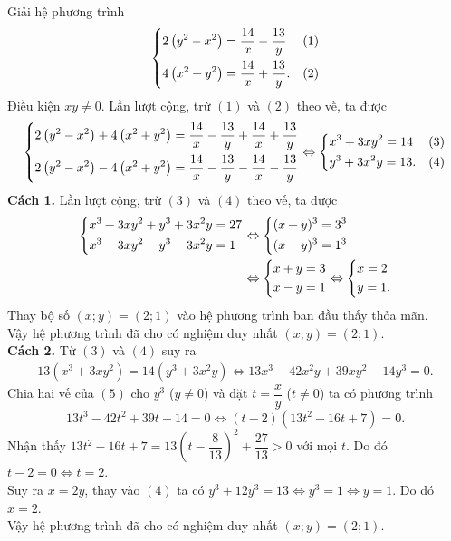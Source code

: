 \begin{bt}%
Giải hệ phương trình $$ \left\{\begin{aligned}&2\left(y^2-x^2\right)=\dfrac{14}{x}-\dfrac{13}{y}& (1)\\ &4\left(x^2+y^2\right)=\dfrac{14}{x}+\dfrac{13}{y}.& (2)\end{aligned}\right.$$
\loigiai
{Điều kiện $xy\neq 0$. Lần lượt cộng, trừ $(1)$ và $(2)$ theo vế, ta được
$$ \left\{\begin{aligned}&2\left(y^2-x^2\right)+4\left(x^2+y^2\right)=\dfrac{14}{x}-\dfrac{13}{y}+\dfrac{14}{x}+\dfrac{13}{y}\\ &2\left(y^2-x^2\right)-4\left(x^2+y^2\right)=\dfrac{14}{x}-\dfrac{13}{y}-\dfrac{14}{x}-\dfrac{13}{y}\end{aligned}\right.\Leftrightarrow \left\{\begin{aligned}&x^3+3xy^2=14&(3)\\ &y^3+3x^2y=13.&(4)\end{aligned}\right.$$
\noindent \textbf{Cách 1.} Lần lượt cộng, trừ $(3)$ và $(4)$ theo vế, ta được
\begin{align*}
\left\{\begin{aligned}&x^3+3xy^2+y^3+3x^2y=27\\ &x^3+3xy^2-y^3-3x^2y=1\end{aligned}\right.&\Leftrightarrow \left\{\begin{aligned}&(x+y)^3=3^3\\ &(x-y)^3=1^3\end{aligned}\right.\\
&\Leftrightarrow \left\{\begin{aligned}&x+y=3\\ &x-y=1\end{aligned}\right.\Leftrightarrow \left\{\begin{aligned}&x=2\\ &y=1.\end{aligned}\right.
\end{align*}
Thay bộ số $(x;y)=(2;1)$ vào hệ phương trình ban đầu thấy thỏa mãn.\\
Vậy hệ phương trình đã cho có nghiệm duy nhất $(x;y)=(2;1)$.\\
\noindent \textbf{Cách 2.} Từ $(3)$ và $(4)$ suy ra
\begin{align*}
13\left(x^3+3xy^2\right)=14\left(y^3+3x^2y\right)\Leftrightarrow 13x^3-42x^2y+39xy^2-14y^3=0.\tag{5}
\end{align*}
Chia hai vế của $(5)$ cho $y^3$ ($y\neq 0$) và đặt $t=\dfrac{x}{y}$ ($t\neq 0$) ta có phương trình
$$13t^3-42t^2+39t-14=0\Leftrightarrow (t-2)\left(13t^2-16t+7\right)=0.$$
Nhận thấy $13t^2-16t+7=13\left(t-\dfrac{8}{13}\right)^2+\dfrac{27}{13}>0$ với mọi $t$. Do đó $t-2=0\Leftrightarrow t=2$.\\
Suy ra $x=2y$, thay vào $(4)$ ta có $y^3+12y^3=13\Leftrightarrow y^3=1\Leftrightarrow y=1$. Do đó $x=2$.\\
Vậy hệ phương trình đã cho có nghiệm duy nhất $(x;y)=(2;1)$.
}
\end{bt}
